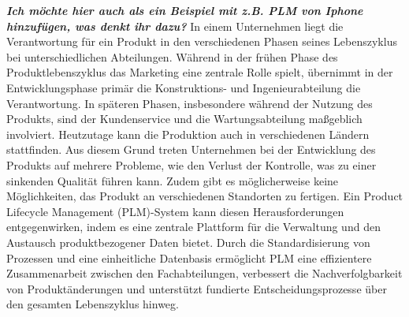 \documentclass[a4paper, 12pt]{scrartcl}
\begin{document}
	\textbf{\textit{Ich möchte hier auch als ein Beispiel mit z.B. PLM von Iphone hinzufügen, was denkt ihr dazu?}}
	\newline 
	\newline
	In einem Unternehmen liegt die Verantwortung für ein Produkt in den verschiedenen Phasen seines Lebenszyklus bei unterschiedlichen Abteilungen. Während in der frühen Phase des Produktlebenszyklus das Marketing eine zentrale Rolle spielt, übernimmt in der Entwicklungsphase primär die Konstruktions- und Ingenieurabteilung die Verantwortung. In späteren Phasen, insbesondere während der Nutzung des Produkts, sind der Kundenservice und die Wartungsabteilung maßgeblich involviert. Heutzutage kann die Produktion auch in verschiedenen Ländern stattfinden.\newline
	Aus diesem Grund treten Unternehmen bei der Entwicklung des Produkts auf mehrere Probleme, wie den Verlust der Kontrolle, was zu einer sinkenden Qualität führen kann. Zudem gibt es möglicherweise keine Möglichkeiten, das Produkt an verschiedenen Standorten zu fertigen\cite{stark2011product}.\newline
	Ein Product Lifecycle Management (PLM)-System kann diesen Herausforderungen entgegenwirken, indem es eine zentrale Plattform für die Verwaltung und den Austausch produktbezogener Daten bietet. Durch die Standardisierung von Prozessen und eine einheitliche Datenbasis ermöglicht PLM eine effizientere Zusammenarbeit zwischen den Fachabteilungen, verbessert die Nachverfolgbarkeit von Produktänderungen und unterstützt fundierte Entscheidungsprozesse über den gesamten Lebenszyklus hinweg\cite{ozturk2019product}.
\end{document}
